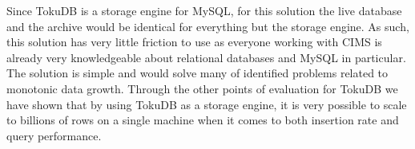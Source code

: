 Since TokuDB is a storage engine for MySQL, for this solution the live database and the archive would be identical for everything but the storage engine. As such, this solution has very little friction to use as everyone working with CIMS is already very knowledgeable about relational databases and MySQL in particular. The solution is simple and would solve many of identified problems related to monotonic data growth. Through the other points of evaluation for TokuDB we have shown that by using TokuDB as a storage engine, it is very possible to scale to billions of rows on a single machine when it comes to both insertion rate and query performance.